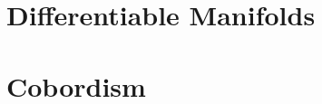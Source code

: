 \documentclass[../../../deep-dive]{subfiles}
\begin{document}
\chapter{Differentiable Manifolds}





% 

\chapter{Cobordism}


\end{document}
